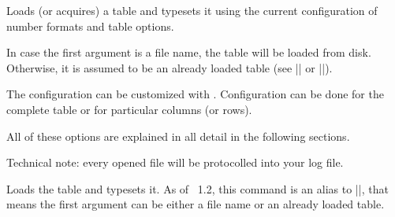 \begin{command}{\pgfplotstabletypeset{}}
	Loads (or acquires) a table and typesets it using the current configuration of number formats and table options.

	In case the first argument is a file name, the table will be loaded from disk. Otherwise, it is assumed to be an already loaded table (see |\pgfplotstableread| or |\pgfplotstablenew|).
\begin{codeexample}[]
\end{codeexample}

	\noindent The configuration can be customized with . Configuration can be done for the complete table or for particular columns (or rows).

\begin{codeexample}[]
\end{codeexample}
\noindent All of these options are explained in all detail in the following sections. 

Technical note: every opened file will be protocolled into your log file.
\end{command}

\begin{command}{\pgfplotstabletypesetfile{}}
	Loads the table  and typesets it. As of \PGFPlotstable\ 1.2, this command is an alias to |\pgfplotstabletypeset|, that means the first argument can be either a file name or an already loaded table.
\end{command}


